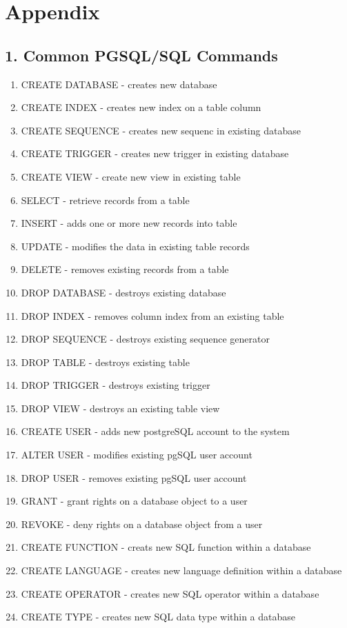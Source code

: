 \documentclass[]{article}
\providecommand{\tightlist}{%
  \setlength{\itemsep}{0pt}\setlength{\parskip}{0pt}}
\begin{document}
\section{Appendix}\label{appendix}

\subsection{1. Common PGSQL/SQL
Commands}\label{common-pgsqlsql-commands}

\begin{enumerate}
\def\labelenumi{\arabic{enumi}.}
\tightlist
\item
  CREATE DATABASE - creates new database
\item
  CREATE INDEX - creates new index on a table column
\item
  CREATE SEQUENCE - creates new sequenc in existing database
\item
  CREATE TRIGGER - creates new trigger in existing database
\item
  CREATE VIEW - create new view in existing table
\item
  SELECT - retrieve records from a table
\item
  INSERT - adds one or more new records into table
\item
  UPDATE - modifies the data in existing table records
\item
  DELETE - removes existing records from a table
\item
  DROP DATABASE - destroys existing database
\item
  DROP INDEX - removes column index from an existing table
\item
  DROP SEQUENCE - destroys existing sequence generator
\item
  DROP TABLE - destroys existing table
\item
  DROP TRIGGER - destroys existing trigger
\item
  DROP VIEW - destroys an existing table view
\item
  CREATE USER - adds new postgreSQL account to the system
\item
  ALTER USER - modifies existing pgSQL user account
\item
  DROP USER - removes existing pgSQL user account
\item
  GRANT - grant rights on a database object to a user
\item
  REVOKE - deny rights on a database object from a user
\item
  CREATE FUNCTION - creats new SQL function within a database
\item
  CREATE LANGUAGE - creates new language definition within a database
\item
  CREATE OPERATOR - creates new SQL operator within a database
\item
  CREATE TYPE - creates new SQL data type within a database
\end{enumerate}
\end{document}
